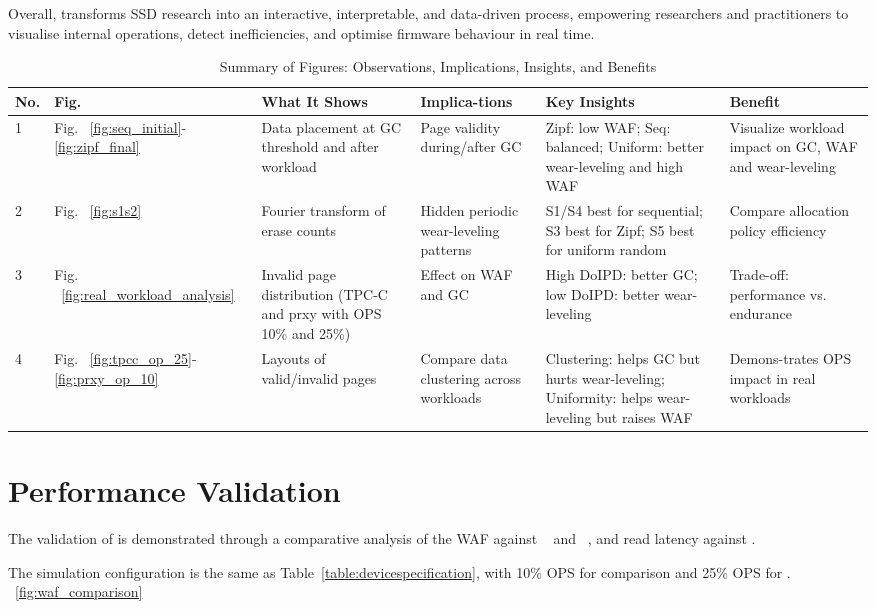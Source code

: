 \documentclass{ieeeaccess}
\begin{document}
Overall, \eyanassdsim transforms SSD research into an interactive, interpretable, and data-driven process, empowering researchers and practitioners to visualise internal operations, detect inefficiencies, and optimise firmware behaviour in real time.
\begin{table}
 \centering
 \caption{Summary of Figures: Observations, Implications, Insights, and Benefits}
 \label{table:all_figure_analysis}
 \begin{tabular}{|p{0.19cm}|p{0.3cm}|p{1.4cm}|p{1cm}|p{1.8cm}|p{1.2cm}|}
 \hline
 \textbf{No.} & \textbf{ Fig.} & \textbf{ What It Shows} & \textbf{ Implica-tions} & \textbf{ Key Insights} & \textbf{ Benefit} \\
 \hline
 1 & Fig. ~\ref{fig:seq_initial}-\ref{fig:zipf_final} & Data placement at GC threshold and after workload & Page validity during/after GC & Zipf: low WAF; Seq: balanced; Uniform: better wear-leveling and high WAF & Visualize workload impact on GC, WAF and wear-leveling \\
 \hline
 2 & Fig. ~\ref{fig:s1s2} & Fourier transform of erase counts & Hidden periodic wear-leveling patterns & S1/S4 best for sequential; S3 best for Zipf; S5 best for uniform random & Compare allocation policy efficiency \\
 \hline
 3 & Fig. ~\ref{fig:real_workload_analysis}& Invalid page distribution (TPC-C and prxy with OPS 10\% and 25\%) & Effect on WAF and GC & High DoIPD: better GC; low DoIPD: better wear-leveling & Trade-off: performance vs. endurance \\
 \hline
 4 & Fig. ~\ref{fig:tpcc_op_25}-\ref{fig:prxy_op_10} & Layouts of valid/invalid pages & Compare data clustering across workloads & Clustering: helps GC but hurts wear-leveling; Uniformity: helps wear-leveling but raises WAF & Demons-trates OPS impact in real workloads \\
 \hline
 \end{tabular}
\end{table}

\section{Performance Validation}
\label{performance_validation}

The validation of \eyanassdsim is demonstrated through a comparative analysis of the WAF against \ftlsim~\cite{FTLSim-ACM-2017} and \femu~\cite{FEMU-FAST-18}, and read latency against \femu.

The simulation configuration is the same as Table~\ref{table:devicespecification}, with 10\% OPS for \ftlsim comparison and 25\% OPS for \femu.
~\ref{fig:waf_comparison} 
\end{document}
